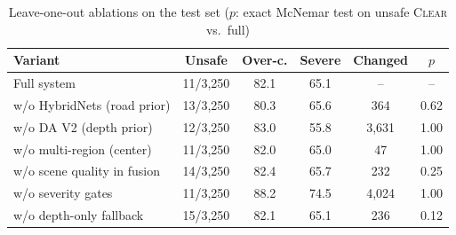 \begin{table}[t]
\centering
\caption{Leave-one-out ablations on the test set ($p$: exact McNemar test on unsafe \textsc{Clear} vs.\ full)}
\label{tab:loo_test}
\footnotesize
\setlength{\tabcolsep}{3pt}
\begin{tabular}{lccccc}
\hline
Variant & Unsafe & Over-c. & Severe & Changed & $p$ \\
\hline
Full system & 11/3{,}250 & 82.1 & 65.1 & -- & -- \\
w/o HybridNets (road prior) & 13/3{,}250 & 80.3 & 65.6 & 364 & 0.62 \\
w/o DA V2 (depth prior) & 12/3{,}250 & 83.0 & 55.8 & 3{,}631 & 1.00 \\
w/o multi-region (center) & 11/3{,}250 & 82.0 & 65.0 & 47 & 1.00 \\
w/o scene quality in fusion & 14/3{,}250 & 82.4 & 65.7 & 232 & 0.25 \\
w/o severity gates & 11/3{,}250 & 88.2 & 74.5 & 4{,}024 & 1.00 \\
w/o depth-only fallback & 15/3{,}250 & 82.1 & 65.1 & 236 & 0.12 \\
\hline
\end{tabular}
\end{table}
